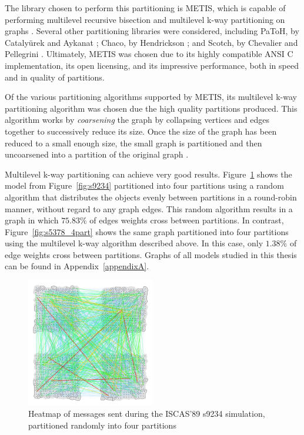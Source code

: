 \documentclass[11pt]{book}
\begin{document}
The library chosen to perform this partitioning is METIS, which is capable of performing multilevel recursive bisection and multilevel k-way partitioning on graphs \cite{karypis-98}. Several other partitioning libraries were considered, including PaToH, by Catalyürek and Aykanat \cite{catalyurek-11}; Chaco, by Hendrickson \cite{hendrickson-94}; and Scotch, by Chevalier and Pellegrini \cite{chevalier-08}. Ultimately, METIS was chosen due to its highly compatible ANSI C implementation, its open licensing, and its impressive performance, both in speed and in quality of partitions.

Of the various partitioning algorithms supported by METIS, its multilevel k-way partitioning algorithm was chosen due the high quality partitions produced. This algorithm works by \emph{coarsening} the graph by collapsing vertices and edges together to successively reduce its size. Once the size of the graph has been reduced to a small enough size, the small graph is partitioned and then uncoarsened into a partition of the original graph \cite{karypis-98}.

Multilevel k-way partitioning can achieve very good results. Figure~\ref{fig:s5378_4rr} shows the model from Figure~\ref{fig:s9234} partitioned into four partitions using a random algorithm that distributes the objects evenly between partitions in a round-robin manner, without regard to any graph edges. This random algorithm results in a graph in which \(75.83\%\) of edges weights cross between partitions. In contrast, Figure~\ref{fig:s5378_4part} shows the same graph partitioned into four partitions using the multilevel k-way algorithm described above. In this case, only \(1.38\%\) of edge weights cross between partitions. Graphs of all models studied in this thesis can be found in Appendix~\ref{appendixA}.

\begin{figure}[ht]\label{fig:s5378_4rr}
\centering
\includegraphics[clip=true,width=0.5\textwidth]{figs/s9234_4rr}
\caption{Heatmap of messages sent during the ISCAS'89 s9234 simulation, partitioned randomly into four partitions}
\end{figure}
\end{document}
